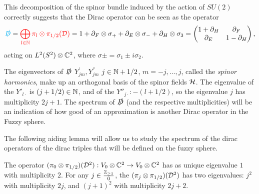 \lin

This decomposition of the spinor bundle induced by the action of $SU(2)$ correctly suggests that the Dirac operator can be seen as the operator
\begin{equation}
    \textcolor{cyan}{\slashed D} = \textcolor{red}{ \bigoplus_{l\in \mathbb{N}} \pi_l  \otimes \pi_{1/2}(\mathcal D)} = 1 + \partial_F \otimes \sigma_+ + \partial_E \otimes \sigma_- + \partial_H \otimes \sigma_3 = \begin{pmatrix} 1 + \partial_H & \partial_F \\ \partial_E & 1 - \partial_H\end{pmatrix} ,
\end{equation} acting on $L^2(S^2)\otimes \mathbb{C}^2$, where $\sigma \pm = \sigma_1 \pm i \sigma_2$.

The eigenvectors of $\slashed D$ $Y^{'}_{jm}, Y^{''}_{jm}$ $j \in \mathbb{N} + 1/2$, $m = -j, \dots, j$, called the \textit{spinor harmonics}, make up an orthogonal basis of the spinor fields $\mathcal H$. The eigenvalue of the $Y'_{l\cdot}$ is $(j + 1/2) \in \mathbb{N}$, and of the $Y{''}_{j\cdot}: -(l + 1/2)$, so the eigenvalue $j$ has multiplicity $2j+1$. The spectrum of $\slashed D$ (and the respective multiplicities) will be an indication of how good of an approximation is another Dirac operator in the Fuzzy sphere. 

{\color{gray}
The following aiding lemma will allow us to study the spectrum of the dirac operators of the dirac triples that will be defined on the fuzzy sphere.

\begin{lemma}
The operator $(\pi_0 \otimes \pi_{1/2})(\mathcal D^2): V_0 \otimes \mathbb{C}^2 \to V_0 \otimes \mathbb{C}^2$ has as unique eigenvalue $1$ with multiplicity $2$. For any $j \in \frac{\mathbb{Z}_{\geq 1}}{0}$, the $(\pi_j \otimes \pi_{1/2})(\mathcal D^2)$ has two eigenvalues: $j^2$ with multiplicity $2j$, and $(j+1)^2$ with multiplicity $2j+2$.
\end{lemma}

}

\linea


